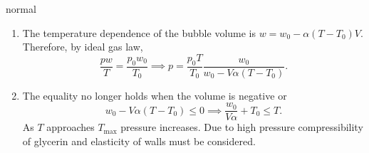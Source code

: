 \begin{solution}{normal}
\begin{enumerate}
    \item The temperature dependence of the bubble volume is $ w= w_0 - \alpha(T-T_0)V$. Therefore, by ideal gas law,
$$ \frac{pw}{T} = \frac{p_0w_0}{T_0} \implies p = \frac{p_0T}{T_0} \frac{w_0}{w_0 - V\alpha(T-T_0)}.$$
\item The equality no longer holds when the volume is negative or $$w_0-V\alpha(T-T_0) \leq 0 \implies \frac{w_0}{V\alpha} + T_0 \leq T.$$As $T$ approaches $T_{\text{max}}$ pressure increases. Due to high pressure compressibility of glycerin and elasticity of walls must be considered.
\end{enumerate} 

\end{solution}